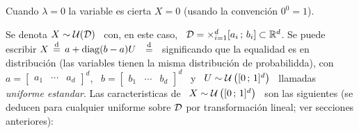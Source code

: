 Cuando $\lambda = 0$ la variable es  cierta $X = 0$ (usando la convenci\'on $0^0
= 1$).  





\label{Ssec:MP:EjemplosDistribucionescontinuas}





Se denota $X \sim \mathcal{U}(\mathcal{D})$ \ con,  en este caso, \ $\mathcal{D} = \operatorname*{\times}_{i=1}^d [a_i \,
; \, b_i] \subset \mathbb{R}^d$.  Se puede escribir $X \, \stackrel{\mathrm{d}}{=} \, a + \operatorname{diag}(b-a) U$
\ $\stackrel{\mathrm{d}}{=}$ \  significando que la equalidad es  en distribuci\'on (las variables
tienen la misma distribuci\'on de  probabilidda), con \ $a = \begin{bmatrix} a_1
& \cdots & a_d \end{bmatrix}^d$, \ $b =
\begin{bmatrix} b_1 & \cdots & b_d \end{bmatrix}^d$  \ y \ $U \sim \mathcal{U} \left( [ 0
\, ; \,  1 ]^d \right)$ \ llamadas {\em  uniforme estandar}. Las caracteristicas
de \  $X \sim \mathcal{U}  \left( [ 0  \, ; \,  1 ]^d \right)$  \ son las  siguientes (se
deducen  para cualquier  uniforme sobre  $\mathcal{D}$ por  transformaci\'on  lineal; ver
secciones anteriores):

